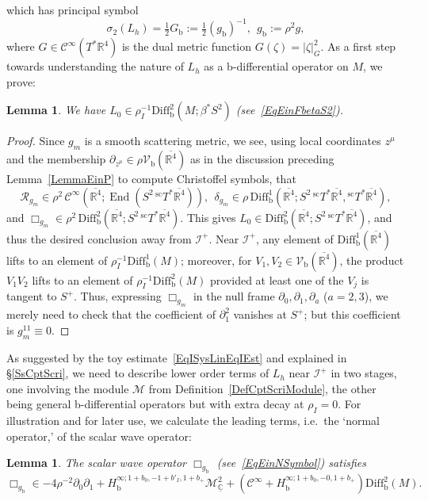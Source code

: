 \documentclass[reqno,11pt,letterpaper]{amsart}
\numberwithin{equation}{section}
\numberwithin{figure}{section}
\newtheorem{lemma}[thm]{Lemma}
\theoremstyle{definition}
\theoremstyle{remark}
\newcommand{\mc}{\mathcal}
\newcommand{\cC}{\mc C}
\newcommand{\cM}{\mc M}
\newcommand{\ms}{\mathscr}
\newcommand{\scri}{\ms I}
\newcommand{\sR}{\ms R}
\newcommand{\C}{\mathbb{C}}
\newcommand{\R}{\mathbb{R}}
\newcommand{\End}{\operatorname{End}}
\newcommand{\ol}{\overline}
\newcommand{\pa}{\partial}
\newcommand{\ul}[1]{\underline{#1}{}}
\newcommand{\bop}{{\mathrm{b}}}
\newcommand{\scl}{{\mathrm{sc}}}
\newcommand{\Diff}{\mathrm{Diff}}
\newcommand{\Vf}{\mathcal V}
\newcommand{\Vb}{\Vf_\bop}
\newcommand{\Diffb}{\Diff_\bop}
\newcommand{\Tsc}{{}^{\scl}T}
\newcommand{\half}{\tfrac{1}{2}}
\newcommand{\CI}{\cC^\infty}
\newcommand{\Hb}{H_{\bop}}
\begin{document}
which has principal symbol
\begin{equation}
\label{EqEinNSymbol}
  \sigma_2(L_h) = \half G_\bop := \half(g_\bop)^{-1},\ \ g_\bop:=\rho^2 g,
\end{equation}
where $G\in\CI(T^*\R^4)$ is the dual metric function $G(\zeta)=|\zeta|_G^2$. As a first step towards understanding the nature of $L_h$ as a b-differential operator on $M$, we prove:
\begin{lemma}
\label{LemmaEinNL0}
  We have $L_0\in\rho_I^{-1}\Diffb^2(M;\beta^*S^2)$ (see~\eqref{EqEinFbetaS2}).
\end{lemma}
\begin{proof}
  Since $g_m$ is a smooth scattering metric, we see, using local coordinates $z^\mu$ and the membership $\pa_{z^\mu}\in\rho\Vb(\ol{\R^4})$ as in the discussion preceding Lemma~\ref{LemmaEinP} to compute Christoffel symbols, that
  \[
    \sR_{g_m}\in\rho^2\,\CI(\ol{\R^4};\End(S^2\,\Tsc^*\ol{\R^4})),\ \ 
    \delta_{g_m}\in\rho\,\Diffb^1(\ol{\R^4};S^2\,\Tsc^*\ol{\R^4},\Tsc^*\ol{\R^4}),
  \]
  and $\Box_{g_m}\in\rho^2\,\Diffb^2(\ol{\R^4};S^2\,\Tsc^*\ol{\R^4})$. This gives $L_0\in\Diffb^2(\ol{\R^4};S^2\,\Tsc^*\ol{\R^4})$, and thus the desired conclusion away from $\scri^+$. Near $\scri^+$, any element of $\Diffb^1(\ol{\R^4})$ lifts to an element of $\rho_I^{-1}\Diffb^1(M)$; moreover, for $V_1,V_2\in\Vb(\ol{\R^4})$, the product $V_1 V_2$ lifts to an element of $\rho_I^{-1}\Diffb^2(M)$ provided at least one of the $V_j$ is tangent to $S^+$. Thus, expressing $\Box_{g_m}$ in the null frame $\pa_0,\pa_1,\pa_a$ ($a=2,3$), we merely need to check that the coefficient of $\pa_1^2$ vanishes at $S^+$; but this coefficient is $g_m^{1 1}\equiv 0$.
\end{proof}

As suggested by the toy estimate~\eqref{EqISysLinEqIEst} and explained in \S\ref{SsCptScri}, we need to describe lower order terms of $L_h$ near $\scri^+$ in two stages, one involving the module $\cM$ from Definition~\ref{DefCptScriModule}, the other being general b-differential operators but with extra decay at $\rho_I=0$. For illustration and for later use, we calculate the leading terms, i.e.\ the `normal operator,' of the scalar wave operator:

\begin{lemma}
\label{LemmaEinNScalarBox}
  The scalar wave operator $\Box_{g_\bop}$ (see~\eqref{EqEinNSymbol}) satisfies
  \begin{equation}
  \label{EqEinNScalarBox}
    \Box_{g_\bop} \in -4\rho^{-2}\pa_0\pa_1 +\Hb^{\infty;1+b_0,-1+b'_I,1+b_+}\cM^2_{\ul\C} + (\CI+\Hb^{\infty;1+b_0,-0,1+b_+})\Diffb^2(M).
  \end{equation}
\end{lemma}
\end{document}
